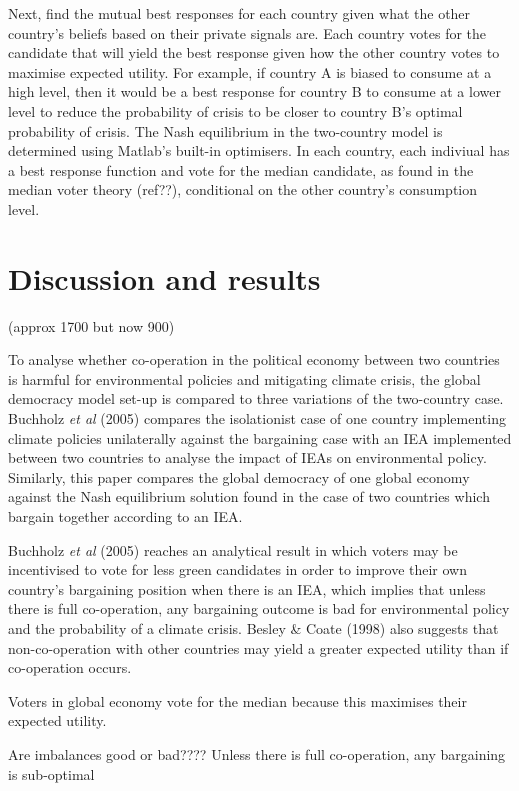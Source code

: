 \documentclass[11pt,preprint, authoryear]{elsarticle}
\numberwithin{equation}{section}
\numberwithin{figure}{section}
\numberwithin{table}{section}
\begin{document}
Next, find the mutual best responses for each country given what the
other country's beliefs based on their private signals are. Each country
votes for the candidate that will yield the best response given how the
other country votes to maximise expected utility. For example, if
country A is biased to consume at a high level, then it would be a best
response for country B to consume at a lower level to reduce the
probability of crisis to be closer to country B's optimal probability of
crisis. The Nash equilibrium in the two-country model is determined
using Matlab's built-in optimisers. In each country, each indiviual has
a best response function and vote for the median candidate, as found in
the median voter theory (ref??), conditional on the other country's
consumption level.

\hypertarget{discussion-and-results}{%
\section{Discussion and results}\label{discussion-and-results}}

(approx 1700 but now 900)

To analyse whether co-operation in the political economy between two
countries is harmful for environmental policies and mitigating climate
crisis, the global democracy model set-up is compared to three
variations of the two-country case. Buchholz \emph{et al} (2005)
compares the isolationist case of one country implementing climate
policies unilaterally against the bargaining case with an IEA
implemented between two countries to analyse the impact of IEAs on
environmental policy. Similarly, this paper compares the global
democracy of one global economy against the Nash equilibrium solution
found in the case of two countries which bargain together according to
an IEA.

Buchholz \emph{et al} (2005) reaches an analytical result in which
voters may be incentivised to vote for less green candidates in order to
improve their own country's bargaining position when there is an IEA,
which implies that unless there is full co-operation, any bargaining
outcome is bad for environmental policy and the probability of a climate
crisis. Besley \& Coate (1998) also suggests that non-co-operation with
other countries may yield a greater expected utility than if
co-operation occurs.

Voters in global economy vote for the median because this maximises
their expected utility.

Are imbalances good or bad???? Unless there is full co-operation, any
bargaining is sub-optimal
\end{document}
